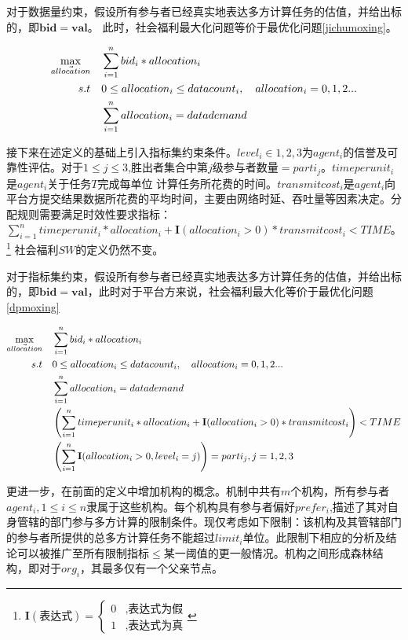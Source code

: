 \documentclass[promaster]{thesis-uestc}
\begin{document}
对于数据量约束，假设所有参与者已经真实地表达多方计算任务的估值，并给出标的，即$\mathbf{bid} = \mathbf{val}$。 此时，社会福利最大化问题等价于最优化问题\ref{jichumoxing}。

\begin{align}
    \label{jichumoxing}\max_{\vec{allocation}} \quad&\sum_{i=1}^{n}{bid_i*allocation_i}\\
    s.t                     \quad& 0\leq allocation_i\leq datacount_i,\quad allocation_i = {0,1,2...}\notag\\
                            \quad& \sum_{i=1}^{n}{allocation_i} = datademand\notag 
\end{align}

接下来在述定义的基础上引入指标集约束条件。$level_i\in {1,2,3}$为$agent_i$的信誉及可靠性评估。对于$1\leq j \leq 3$,胜出者集合中第$j$级参与者数量$=parti_j$。$timeperunit_i$是$agent_i$关于$任务T$完成每单位
计算任务所花费的时间。$transmitcost_i$是$agent_i$向平台方提交结果数据所花费的平均时间，主要由网络时延、吞吐量等因素决定。分配规则需要满足时效性要求指标：$\sum_{i=1}^{n}{timeperunit_i*allocation_i+\mathbf{I}(allocation_i > 0)*transmitcost_i} < TIME$。
\footnote{$\mathbf{I}(\text{表达式}) = \begin{cases}{}
        0&,\text{表达式为假}\\
        1&,\text{表达式为真}
        \end{cases}$
}%
社会福利$SW$的定义仍然不变。

对于指标集约束，假设所有参与者已经真实地表达多方计算任务的估值，并给出标的，即$\mathbf{bid} = \mathbf{val}$，此时对于平台方来说，社会福利最大化等价于最优化问题\ref{dpmoxing}

\begin{align}
    \label{dpmoxing}\max_{\vec{allocation}} \quad&\sum_{i=1}^{n}{bid_i*allocation_i}\\
    s.t\quad& 0\leq allocation_i\leq datacount_i,\quad allocation_i = {0,1,2...}\notag\\
        \quad& \sum_{i=1}^{n}{allocation_i} = datademand\notag\\
        \quad& \left(\sum_{i=1}^{n}{timeperunit_i*allocation_i+\mathbf{I}(allocation_i > 0)*transmitcost_i}\right) < TIME\notag\\
        \quad& \left(\sum_{i=1}^{n}{\mathbf{I}(allocation_i > 0,level_i = j)}\right)=parti_j, j = {1,2,3}\notag
\end{align}

更进一步，在前面的定义中增加机构的概念。机制中共有$m$个机构，所有参与者$agent_i,1 \leq i \leq n$隶属于这些机构。每个机构具有参与者偏好$prefer_i$,描述了其对自身管辖的部门参与多方计算的限制条件。现仅考虑如下限制：该机构及其管辖部门的参与者所提供的总多方计算任务不能超过$limit_i$单位。此限制下相应的分析及结论可以被推广至所有限制指标$\leq$某一阈值的更一般情况。机构之间形成森林结构，即对于$org_i$，其最多仅有一个父亲节点。
\end{document}
